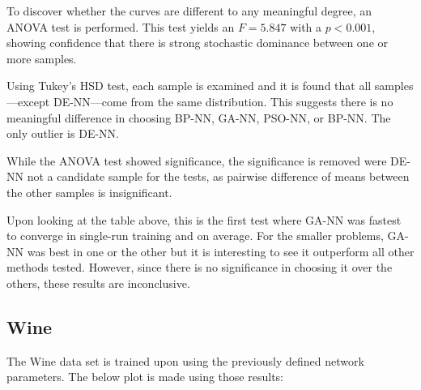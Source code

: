 \documentclass[a4paper,12pt]{article}
\begin{document}
To discover whether the curves are different to any meaningful degree, an ANOVA test is performed. This test yields an $F = 5.847$ with a $p < 0.001$, showing confidence that there is strong stochastic dominance between one or more samples.

Using Tukey's HSD test, each sample is examined and it is found that all samples---except DE-NN---come from the same distribution. This suggests there is no meaningful difference in choosing BP-NN, GA-NN, PSO-NN, or BP-NN. The only outlier is DE-NN.

While the ANOVA test showed significance, the significance is removed were DE-NN not a candidate sample for the tests, as pairwise difference of means between the other samples is insignificant.

\begin{table}[h!]
\centering
{}
\caption{Minimum and average time to terminate for Wheat Seeds data set.}
\label{Tab:wheat-min}
\end{table}

Upon looking at the table above, this is the first test where GA-NN was fastest to converge in single-run training and on average. For the smaller problems, GA-NN was best in one or the other but it is interesting to see it outperform all other methods tested. However, since there is no significance in choosing it over the others, these results are inconclusive.

\pagebreak

\subsection{Wine}

The Wine data set is trained upon using the previously defined network parameters. The below plot is made using those results:
\end{document}
